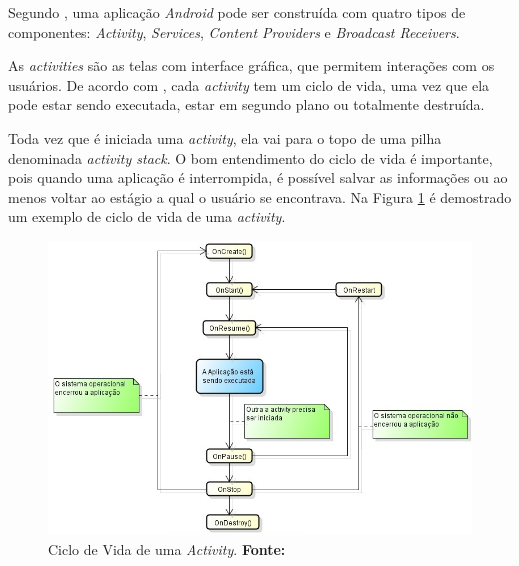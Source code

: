 	\par Segundo , uma aplicação \textit{Android} pode ser
construída com quatro tipos de componentes: \textit{Activity},
\textit{Services}, \textit{Content Providers} e \textit{Broadcast Receivers}.

	\par As \textit{activities} são as telas com interface gráfica, que permitem
interações com os usuários. De acordo com , cada
\textit{activity} tem um ciclo de vida, uma vez que ela pode estar sendo
executada, estar em segundo plano ou totalmente destruída.

	\par Toda vez que é iniciada uma \textit{activity}, ela vai para o topo de uma
pilha denominada \textit{activity stack}. O bom entendimento do ciclo de vida é
importante, pois quando uma aplicação é interrompida, é possível salvar as
informações ou ao menos voltar ao estágio a qual o usuário se encontrava. Na
Figura \ref{fig:qt1} é demostrado um exemplo de ciclo de vida de uma
\textit{activity}.

\begin{figure}[h!]
	\centerline{\includegraphics[scale=0.5]{./imagens/1_q_teorico/qt1.png}}
	\caption[Ciclo de Vida de uma \textit{Activity} ]{Ciclo de Vida de uma
	\textit{Activity}.
	 \textbf{Fonte:}}
	\label{fig:qt1}
\end{figure}

